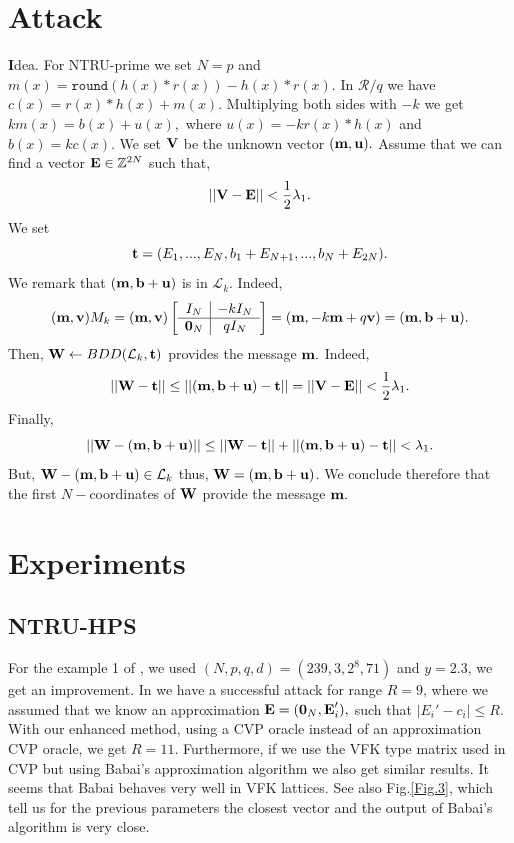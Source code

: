 \documentclass{amsart}
\numberwithin{equation}{section}
\begin{document}
\section{Attack}
{\textbf Idea}. For NTRU-prime we set $N=p$ and $m(x)=\texttt{round}(h(x)*r(x)) - h(x)*r(x).$ In ${\mathcal{R}}/q$ we have $c(x)=r(x)*h(x)+m(x).$ Multiplying both sides with $-k$ we get 
$km(x)=b(x)+u(x),$
where $u(x)=-kr(x)*h(x)$ and $b(x)=kc(x).$
We set ${\textbf V}$ be the unknown vector $({\textbf m},{\textbf u}).$ Assume that we can find a vector ${\textbf E}\in {\mathbb{Z}}^{2N}$ such that,
$$||{\textbf V}-{\textbf E}||<\frac{1}{2}\lambda_1.$$
We set 
$${\textbf t}=(E_1,...,E_N,b_1+E_{N+1},...,b_N+E_{2N}).$$
We remark that 
$({\textbf m},{\textbf b}+{\textbf u})$ is in ${\mathcal{L}}_k.$ 
Indeed,
$$({\textbf m},{\textbf v})M_k=
({\textbf m},{\textbf v})\left[\begin{array}{c|c}
			I_N & -kI_N  \\
			\hline
			{\textbf 0}_N & qI_N   \\
		\end{array}\right] = 	 ({\textbf m},-k{\textbf m}+q{\textbf v})=({\textbf m},{\textbf b}+{\textbf u}).$$
Then, ${\textbf W}\leftarrow BDD({\mathcal{L}}_k,{\textbf t})$  provides the message ${\textbf m}.$ Indeed,
$$||{\textbf W} - {\textbf t}||\le ||({\textbf m},{\textbf b}+{\textbf u})-{\textbf t}||=||{\textbf V}-{\textbf E}||<\frac{1}{2}\lambda_1.$$
Finally, 
$$||{\textbf W}-({\textbf m},{\textbf b}+{\textbf u})||\le ||{\textbf W}-{\textbf t}|| +  ||({\textbf m},{\textbf b}+{\textbf u}) - {\textbf t}||<\lambda_1.$$
But, ${\textbf W}-({\textbf m},{\textbf b}+{\textbf u})\in {\mathcal{L}}_k$ thus, ${\textbf W}=({\textbf m},{\textbf b}+{\textbf u})$. We conclude therefore that the first $N-$coordinates of ${\textbf W}$ provide the message ${\textbf m}.$
\section{Experiments}
\subsection{NTRU-HPS}
For the example 1 of \cite{adam_draz}, we used $(N,p,q,d)=(239,3,2^{8},71)$ and $y=2.3$, we get an improvement. In \cite{adam_draz} we have a successful attack for range $R=9$, where we assumed that we know an approximation 
${\textbf E}=({\textbf 0}_N,{\textbf E}_i'),$ such that $|E_i'-c_i|\leq R.$ With our enhanced method, using a CVP oracle instead of an approximation CVP oracle, we get $R=11.$ Furthermore, if we use the VFK type matrix used in CVP but using Babai's approximation algorithm we also get similar results. It seems that Babai behaves very well in VFK lattices. See also Fig.\ref{Fig.3}, which tell us for the previous parameters the closest vector and the output of Babai's algorithm is very close.
\end{document}
